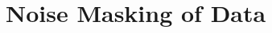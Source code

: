 \documentclass[a4paper,12pt]{article}
\begin{document}
                                                                                                                                                                                                                                                                                                                                                                                                                                                                                                                                                                                                                                                                      \section{Noise Masking of Data}
                                                                                                                                                                                                                                                                                                                                                                                                                                                                                                                                                                                                                                                                                                                                                                                                                                                                                                                                                                                                                                                                                                                                                                                                                                                                                                                                                                                                                                                                                                                                                                                                                                                                                                                                                                                                                                                                                                                                                                                                                                                                                                                                                                                                                                                                                                                                                                                                                                                                                                                                                  
\end{document}
